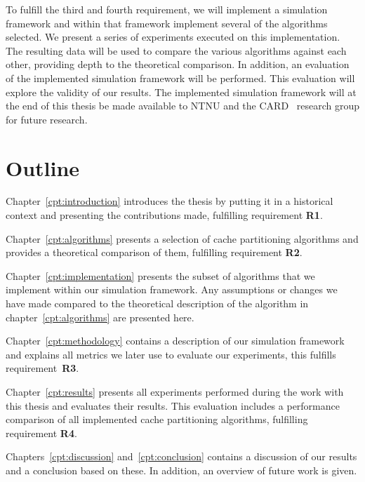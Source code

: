 To fulfill the third and fourth requirement, we will implement a simulation framework and within that framework implement several of the algorithms selected.
We present a series of experiments executed on this implementation.
The resulting data will be used to compare the various algorithms against each other, providing depth to the theoretical comparison.
In addition, an evaluation of the implemented simulation framework will be performed.
This evaluation will explore the validity of our results.
The implemented simulation framework will at the end of this thesis be made available to NTNU and the CARD~\cite{CARD2015} research group for future research.

\section{Outline}

Chapter~\ref{cpt:introduction} introduces the thesis by putting it in a historical context and presenting the contributions made, fulfilling requirement \textbf{R1}.

Chapter~\ref{cpt:algorithms} presents a selection of cache partitioning algorithms and provides a theoretical comparison of them, fulfilling requirement \textbf{R2}.

Chapter~\ref{cpt:implementation} presents the subset of algorithms that we implement within our simulation framework.
Any assumptions or changes we have made compared to the theoretical description of the algorithm in chapter~\ref{cpt:algorithms} are presented here.

Chapter~\ref{cpt:methodology} contains a description of our simulation framework and explains all metrics we later use to evaluate our experiments, this fulfills requirement~\textbf{R3}.

Chapter~\ref{cpt:results} presents all experiments performed during the work with this thesis and evaluates their results. 
This evaluation includes a performance comparison of all implemented cache partitioning algorithms, fulfilling requirement \textbf{R4}.

Chapters~\ref{cpt:discussion} and~\ref{cpt:conclusion} contains a discussion of our results and a conclusion based on these. 
In addition, an overview of future work is given.
